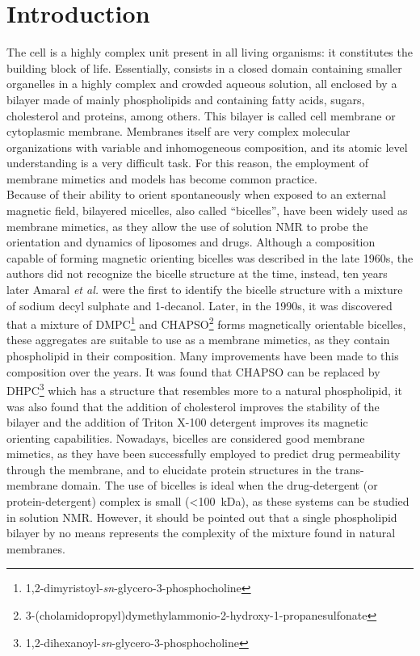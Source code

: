 \documentclass[3p,preprint,review]{elsarticle}
\begin{document}
	\section{Introduction}
	The cell is a highly complex unit present in all living organisms: it
	constitutes the building block of life. Essentially, consists in a closed
	domain
	containing smaller organelles in a highly complex and crowded aqueous solution,
	all enclosed by a bilayer made of mainly phospholipids and containing fatty
	acids, sugars, cholesterol and proteins, among others. This bilayer is called
	cell membrane or cytoplasmic membrane. Membranes itself are very complex
	molecular organizations with variable and inhomogeneous composition, and its
	atomic level understanding is a very difficult task. For this reason, the
	employment of
	membrane mimetics and models has become common practice.\cite{Bondar2019}\\
	Because of their ability to orient spontaneously when exposed to an external
	magnetic field, bilayered micelles, also called ``bicelles'', have been widely
	used as membrane mimetics, as they allow the use of solution NMR to probe the
	orientation and dynamics of liposomes and
	drugs\cite{Beaugrand2016,Montecinos2007,Ruiz-Fernandez2016}. Although a
	composition capable of forming magnetic orienting bicelles was described in the
	late 1960s\cite{Lawson1967}, the authors did not recognize the bicelle structure
	at the time, instead, ten years later Amaral \textit{et al.} were the first to
	identify the bicelle structure
	with a mixture of sodium decyl sulphate and
	1-decanol\cite{Amaral1979}. Later,
	in the 1990s, it was discovered that a
	mixture of DMPC\footnote{1,2-dimyristoyl-\textit{sn}-glycero-3-phosphocholine}
	and
	CHAPSO\footnote{3-(cholamidopropyl)dymethylammonio-2-hydroxy-1-propanesulfonate}
	forms magnetically orientable bicelles\cite{Sanders1990}, these aggregates are
	suitable to use as a membrane mimetics, as they contain
	phospholipid in their composition. Many improvements have been made to this
	composition over the years. It was found that CHAPSO can be replaced by
	DHPC\footnote{1,2-dihexanoyl-\textit{sn}-glycero-3-phosphocholine} which has a
	structure that resembles more to a natural phospholipid\cite{Sanders1992}, it
	was also found
	that the addition of cholesterol improves the stability of the
	bilayer\cite{Shapiro2010} and
	the addition of Triton X-100 detergent improves its magnetic orienting
	capabilities\cite{Park2010}. Nowadays, bicelles are considered good membrane
	mimetics, as they have been successfully employed to predict drug permeability
	through the membrane\cite{Sun2008,Durr2013,Matsumori2007,Koenig2005}, and to
	elucidate
	protein structures in the trans-membrane domain\cite{Durr2012}. The use of
	bicelles is ideal when
	the
	drug-detergent (or protein-detergent) complex is small (<\SI{100}{kDa}), as
	these systems can be studied in solution
	NMR\cite{Warschawski2011,Raschle2010,Sanders2006}. However, it should be
	pointed out that a single phospholipid bilayer by no means represents the
	complexity of the mixture found in natural membranes.\\
	
\end{document}
